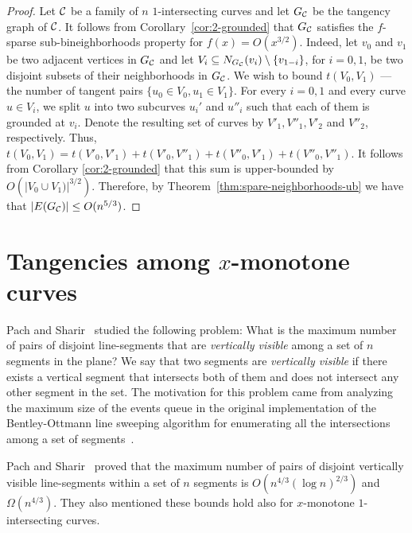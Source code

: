 \documentclass[11pt]{article}
\theoremstyle{definition}
\def\C{{\cal C}}
\begin{document}
\begin{proof}
Let $\C$ be a family of $n$ $1$-intersecting curves and
let $G_\C$ be the tangency graph of $\C$.
It follows from Corollary~\ref{cor:2-grounded} that $G_\C$ satisfies the $f$-sparse sub-bineighborhoods property for $f(x)=O(x^{3/2})$.
Indeed, let $v_0$ and $v_1$ be two adjacent vertices in $G_\C$ and let $V_i \subseteq N_{G_\C}(v_i) \setminus \{v_{1-i}\}$, for $i=0,1$, be two disjoint subsets of their neighborhoods in $G_\C$.
We wish to bound $t(V_0,V_1)$ --- the number of tangent pairs $\{u_0 \in V_0, u_1 \in V_1\}$.
For every $i=0,1$ and every curve $u \in V_i$, we split $u$ into two subcurves $u_i'$ and $u''_i$ such that each of them is grounded at $v_i$.
Denote the resulting set of curves by $V'_1, V''_1, V'_2$ and $V''_2$, respectively.
Thus, $t(V_0,V_1)=t(V'_0,V'_1)+t(V'_0,V''_1)+t(V''_0,V'_1)+t(V''_0,V''_1)$.
It follows from Corollary \ref{cor:2-grounded} that this sum is upper-bounded by  $O(|V_0 \cup V_1)|^{3/2})$.
Therefore, by Theorem~\ref{thm:spare-neighborhoods-ub} we have that $|E(G_\C)| \le O(n^{5/3})$.
\end{proof}



\section{Tangencies among $x$-monotone curves}
\label{sec:x-mon}

Pach and Sharir~\cite{Pach-Sharir} studied the following problem: 
What is the maximum number of pairs of disjoint line-segments that are \emph{vertically visible} among a set of $n$ segments in the plane?
We say that two segments are \emph{vertically visible} if there exists a vertical segment that intersects both of them and does not intersect any other segment in the set.
The motivation for this problem came from analyzing the maximum size of the events queue in the original implementation of the Bentley-Ottmann line sweeping algorithm for enumerating all the intersections among a set of segments~\cite{Bentely-Ottmann}.

Pach and Sharir~\cite{Pach-Sharir} proved that the maximum number of pairs of disjoint vertically visible line-segments within a set of $n$ segments is $O\left(n^{4/3}\left(\log n\right)^{2/3}\right)$ and $\Omega\left(n^{4/3}\right)$.
They also mentioned these bounds hold also for $x$-monotone $1$-intersecting curves.
\end{document}
